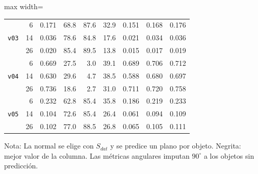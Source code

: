 \begin{table}[htbp]
\begin{lrbox}{\tablebox}
\begin{adjustbox}{max width=\textwidth}
\begin{tabular}{lrrrrrrrr}
\multirow{3}{*}{\texttt{v03}} & 6 & 0.171 & 68.8 & 87.6 & 32.9 & 0.151 & 0.168 & 0.176 \\
 & 14 & 0.036 & 78.6 & 84.8 & 17.6 & 0.021 & 0.034 & 0.036 \\
 & 26 & 0.020 & 85.4 & 89.5 & 13.8 & 0.015 & 0.017 & 0.019 \\
\midrule
\multirow{3}{*}{\texttt{v04}} & 6 & 0.669 & 27.5 & 3.0 & 39.1 & 0.689 & 0.706 & 0.712 \\
 & 14 & 0.630 & 29.6 & 4.7 & 38.5 & 0.588 & 0.680 & 0.697 \\
 & 26 & 0.736 & 18.6 & 2.7 & 31.0 & 0.711 & 0.720 & 0.758 \\
\midrule
\multirow{3}{*}{\texttt{v05}} & 6 & 0.232 & 62.8 & 85.4 & 35.8 & 0.186 & 0.219 & 0.233 \\
 & 14 & 0.104 & 72.6 & 85.4 & 26.4 & 0.061 & 0.094 & 0.109 \\
 & 26 & 0.102 & 77.0 & 88.5 & 26.8 & 0.065 & 0.105 & 0.111 \\
\bottomrule
\end{tabular}
\end{adjustbox}
\end{lrbox}
\usebox{\tablebox}

\vspace{1.5ex}
\begin{minipage}{\wd\tablebox}
\footnotesize
Nota: La normal se elige con $S_{dat}$ y se predice un plano por objeto. Negrita: mejor valor de la columna. Las métricas angulares imputan $90^\circ$ a los objetos sin predicción.
\end{minipage}
\end{table}

